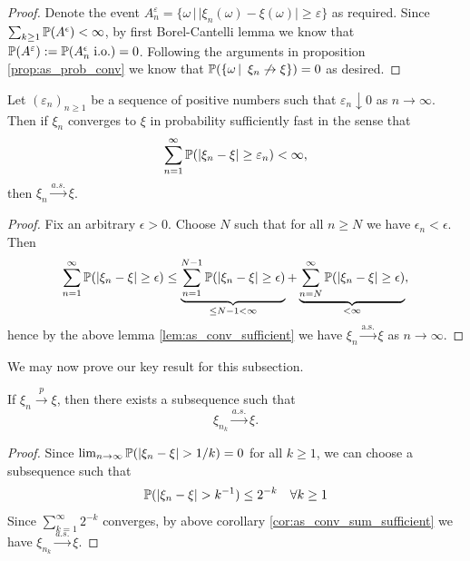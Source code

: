 \begin{proof}
Denote the event $A_n^\varepsilon = \{\omega \,|\, |\xi_n(\omega) - \xi(\omega)| \ge \varepsilon\}$ as required. Since $\sum_{k\geq 1} \mathbb{P}(A^\epsilon) < \infty$, by first Borel-Cantelli lemma we know that $\mathbb{P}(A^\varepsilon) := \mathbb{P}(A_n^\epsilon \; \text{i.o.}) = 0$. Following the arguments in proposition \ref{prop:as_prob_conv} we know that $\mathbb{P}(\left\{ \omega \,|\,\ \xi_n \not\to \xi \right \}) = 0$ as desired.
\end{proof}

\begin{corollary} \label{cor:as_conv_sum_sufficient}
Let $(\varepsilon_n)_{n\ge 1}$ be a sequence of positive numbers such that $\varepsilon_n \downarrow 0$ as $n \to \infty$. Then if $\xi_n$ converges to $\xi$ in probability sufficiently fast in the sense that 
\begin{equation*}
    \sum_{n=1}^\infty \mathbb{P}(|\xi_n - \xi| \ge \varepsilon_n) < \infty,
\end{equation*}
then $\xi_n \xrightarrow{a.s.} \xi$.
\end{corollary}

\begin{proof}
Fix an arbitrary $\epsilon > 0$. Choose $N$ such that for all $n \geq N$ we have $\epsilon_n < \epsilon$. Then 
\begin{equation*}
    \sum_{n=1}^\infty \mathbb{P}(|\xi_n - \xi| \geq \epsilon) \leq \underbrace{\sum_{n=1}^{N-1} \mathbb{P}(|\xi_n - \xi| \geq \epsilon)}_{\leq N-1 < \infty} + \underbrace{\sum_{n=N}^\infty \mathbb{P}(|\xi_n - \xi| \geq \epsilon)}_{<\infty},
\end{equation*}
hence by the above lemma \ref{lem:as_conv_sufficient} we have $\xi_n \overset{\text{a.s.}}{\to} \xi$ as $n \to \infty$.
\end{proof}

We may now prove our key result for this subsection.
\begin{theorem} \label{thm:subsequence_conv_prob}
If $\xi_n \xrightarrow{p} \xi$, then there exists a subsequence such that
\begin{equation*}
    \xi_{n_k}\xrightarrow{a.s.} \xi.
\end{equation*}
\end{theorem}

\begin{proof}
Since $\lim_{n \to \infty} \mathbb{P}(|\xi_n - \xi| > 1/k) = 0$ for all $k \ge 1$, we can choose a subsequence such that 
\begin{equation*}
    \mathbb{P} (|\xi_n - \xi| > k^{-1}) \le 2^{-k} \quad \forall k \ge 1
\end{equation*}
Since $\sum_{k=1}^\infty 2^{-k}$ converges, by above corollary \ref{cor:as_conv_sum_sufficient} we have $\xi_{n_k}\xrightarrow{a.s.} \xi$.
\end{proof}

